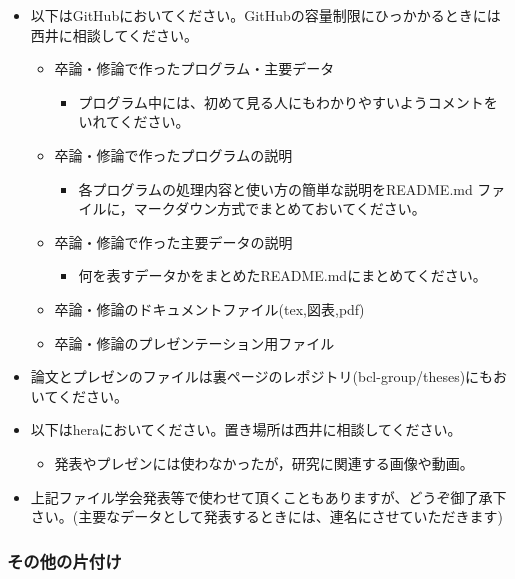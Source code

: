 \documentclass[11pt, ]{jsarticle}
\providecommand{\tightlist}{%
   \setlength{\itemsep}{0pt}\setlength{\parskip}{0pt}}
\begin{document}
\begin{itemize}
\tightlist
\item
  以下はGitHubにおいてください。GitHubの容量制限にひっかかるときには西井に相談してください。

  \begin{itemize}
  \tightlist
  \item
    卒論・修論で作ったプログラム・主要データ

    \begin{itemize}
    \tightlist
    \item
      プログラム中には、初めて見る人にもわかりやすいようコメントをいれてください。
    \end{itemize}
  \item
    卒論・修論で作ったプログラムの説明

    \begin{itemize}
    \tightlist
    \item
      各プログラムの処理内容と使い方の簡単な説明をREADME.md
      ファイルに，マークダウン方式でまとめておいてください。
    \end{itemize}
  \item
    卒論・修論で作った主要データの説明

    \begin{itemize}
    \tightlist
    \item
      何を表すデータかをまとめたREADME.mdにまとめてください。
    \end{itemize}
  \item
    卒論・修論のドキュメントファイル(tex,図表,pdf)
  \item
    卒論・修論のプレゼンテーション用ファイル
  \end{itemize}
\item
  論文とプレゼンのファイルは裏ページのレポジトリ(bcl-group/theses)にもおいてください。
\item
  以下はheraにおいてください。置き場所は西井に相談してください。

  \begin{itemize}
  \tightlist
  \item
    発表やプレゼンには使わなかったが，研究に関連する画像や動画。
  \end{itemize}
\item
  上記ファイル学会発表等で使わせて頂くこともありますが、どうぞ御了承下さい。(主要なデータとして発表するときには、連名にさせていただきます)
\end{itemize}

\hypertarget{ux305dux306eux4ed6ux306eux7247ux4ed8ux3051}{%
\subsubsection{その他の片付け}\label{ux305dux306eux4ed6ux306eux7247ux4ed8ux3051}}
\end{document}
